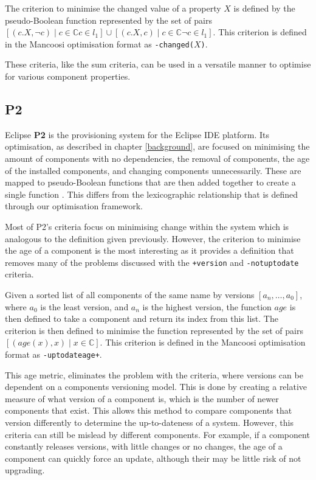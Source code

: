 \begin{defs}
The criterion to minimise the changed value of a property $X$ is defined by the pseudo-Boolean function 
represented by the set of pairs $[(c.X,\neg c) \mid c \in \mathbb{C} c \in l_1] \cup [(c.X,c) \mid c \in \mathbb{C} \neg c \in l_1]$.
This criterion is defined in the Mancoosi optimisation format as \verb!-changed(!$X$\verb+)+.
\end{defs}

These criteria, like the sum criteria, can be used in a versatile manner to optimise for various component properties.

\subsection{P2}
Eclipse \textbf{P2} \citep{le_berre_dependency_2009,leBerre2010} is the provisioning system for the Eclipse IDE platform.
Its optimisation, as described in chapter \ref{background}, are focused on minimising the amount of components with no dependencies, the removal of components,
the age of the installed components, and changing components unnecessarily.
These are mapped to pseudo-Boolean functions that are then added together to create a single function \citep{leBerre2010}.
This differs from the lexicographic relationship that is defined through our optimisation framework.

Most of P2's criteria focus on minimising change within the system which is analogous to the definition given previously.
However, the criterion to minimise the age of a component is the most interesting as it provides a definition that removes many of the problems
discussed with the  \verb!+version! and \verb+-notuptodate+ criteria.

\begin{defs}
Given a sorted list of all components of the same name by versions $[a_n,\ldots,a_0]$, where $a_0$ is the least version, and $a_n$ is the highest version,
the function $age$ is then defined to take a component and return its index from this list.
The criterion is then defined to minimise the function represented by the set of pairs $[(age(x), x) \mid x \in \mathbb{C}]$.
This criterion is defined in the Mancoosi optimisation format as \verb!-uptodateage+!.
\end{defs}

This age metric, eliminates the problem with the criteria, where versions can be dependent on a components versioning model.
This is done by creating a relative measure of what version of a component is, which is the number of newer components that exist.
This allows this method to compare components that version differently to determine the up-to-dateness of a system.
However, this criteria can still be mislead by different components.
For example, if a component constantly releases versions, with little changes or no changes, the age of a component can quickly force an update, 
although their may be little risk of not upgrading. 


